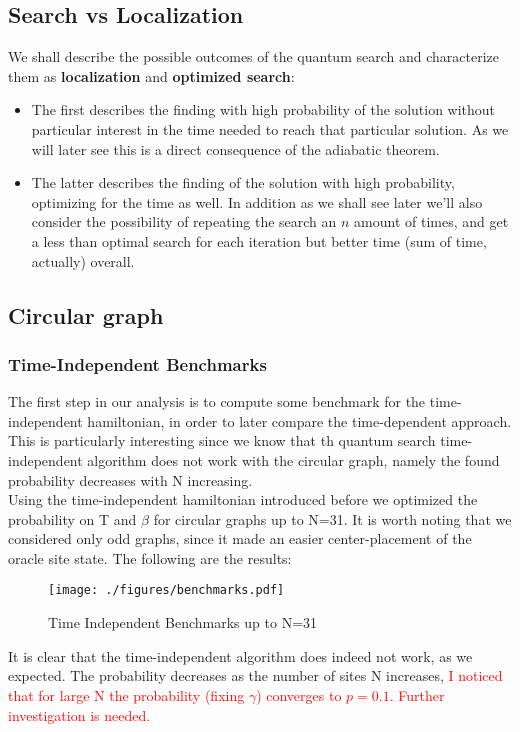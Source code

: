 \documentclass[aps,pra,reprint, onecolumn]{revtex4-2}
\newcommand{\red}[1]{\textcolor{red}{#1}}
\begin{document}
\subsection{Search vs Localization}
We shall describe the possible outcomes of the quantum search and characterize them as \textbf{localization} and \textbf{optimized search}:
\begin{itemize}
\item The first describes the finding with high probability of the solution without particular interest in the time needed to reach that particular solution. As we will later see this is a direct consequence of the adiabatic theorem.

\item The latter describes the finding of the solution with high probability, optimizing for the time as well. In addition as we shall see later we'll also consider the possibility of repeating the search an $n$ amount of times, and get a less than optimal search for each iteration but better time (sum of time, actually) overall.
\end{itemize}

\subsection{Circular graph}
\subsubsection{\textbf{Time-Independent Benchmarks}}
The first step in our analysis is to compute some benchmark for the time-independent hamiltonian, in order to later compare the time-dependent approach. This is particularly interesting since we know that th quantum search time-independent algorithm does not work with the circular graph, namely the found probability decreases with N increasing. \\
Using the time-independent hamiltonian introduced before we optimized the probability on T and $\beta$ for circular graphs up to N=31. It is worth noting that we considered only odd graphs, since it made an easier center-placement of the oracle site state. The following are the results:\\
\begin{figure}[ht]
\texttt{[image: ./figures/benchmarks.pdf]}
\caption{Time Independent Benchmarks up to N=31}
\end{figure}

It is clear that the time-independent algorithm does indeed not work, as we expected. The probability decreases as the number of sites N increases, \red{I noticed that for large N the probability (fixing $\gamma$) converges to $p=0.1$. Further investigation is needed.}
\end{document}
